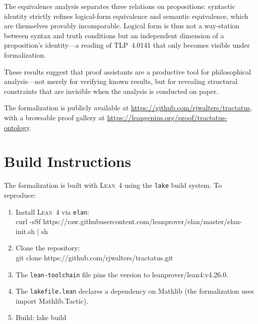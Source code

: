 \documentclass[10pt, letterpaper]{article}
\theoremstyle{definition}
\theoremstyle{remark}
\newcommand{\Lean}{\textsc{Lean}}
\begin{document}
The equivalence analysis separates three relations on
propositions: syntactic identity strictly refines logical-form
equivalence and semantic equivalence, which are themselves
provably incomparable.  Logical form is thus not a way-station
between syntax and truth conditions but an independent dimension
of a proposition's identity---a reading of TLP~4.0141 that only
becomes visible under formalization.

These results suggest that proof assistants are a productive tool
for philosophical analysis---not merely for verifying known
results, but for revealing structural constraints that are
invisible when the analysis is conducted on paper.

The formalization is publicly available at
\url{https://github.com/rjwalters/tractatus}, with a
browsable proof gallery at
\url{https://leangenius.org/proof/tractatus-ontology}.


\appendix

\section{Build Instructions}
\label{app:build}

The formalization is built with \Lean~4 using the \texttt{lake}
build system.  To reproduce:

\begin{enumerate}[nosep]
  \item Install \Lean~4 via \texttt{elan}:\\
    {\small\ttfamily curl -sSf https://raw.githubusercontent.com/\allowbreak{}leanprover/\allowbreak{}elan/\allowbreak{}master/\allowbreak{}elan-init.sh | sh}
  \item Clone the repository:\\
    {\small\ttfamily git clone https://github.com/rjwalters/tractatus.git}
  \item The \texttt{lean-toolchain} file pins the version to
    {\small\ttfamily leanprover/lean4:v4.26.0}.
  \item The \texttt{lakefile.lean} declares a dependency on
    Mathlib (the formalization uses
    {\small\ttfamily import Mathlib.Tactic}).
  \item Build: {\small\ttfamily lake build}
\end{enumerate}
\end{document}
